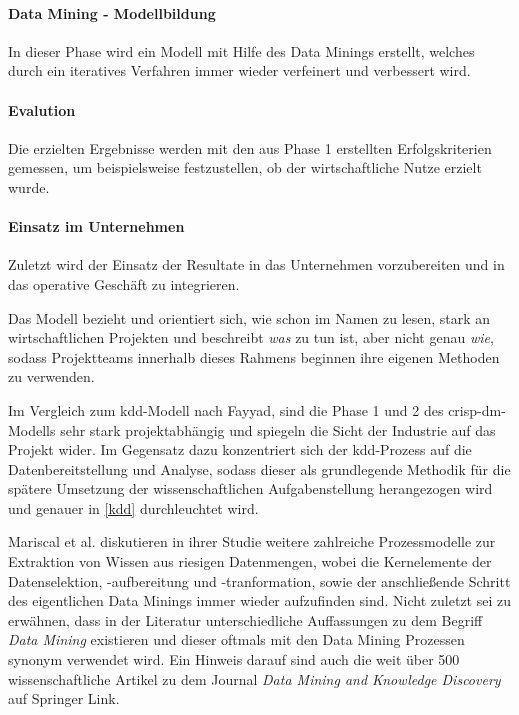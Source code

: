 \paragraph{Data Mining - Modellbildung}
In dieser Phase wird ein Modell mit Hilfe des Data Minings erstellt, welches durch ein iteratives Verfahren immer wieder verfeinert und verbessert wird. 
\paragraph{Evalution}
Die erzielten Ergebnisse werden mit den aus Phase 1 erstellten Erfolgskriterien gemessen, um beispielsweise festzustellen, ob der wirtschaftliche Nutze erzielt wurde.
\paragraph{Einsatz im Unternehmen}
Zuletzt wird der Einsatz der Resultate in das Unternehmen vorzubereiten und in das operative Geschäft zu integrieren.

Das Modell bezieht und orientiert sich, wie schon im Namen zu lesen, stark an wirtschaftlichen Projekten und beschreibt \textit{was} zu tun ist, aber nicht genau \textit{wie}, sodass Projektteams innerhalb dieses Rahmens beginnen ihre eigenen Methoden zu verwenden.

Im Vergleich zum \gls{kdd}-Modell nach Fayyad, sind die Phase 1 und 2 des \gls{crisp-dm}-Modells sehr stark projektabhängig und spiegeln die Sicht der Industrie auf das Projekt wider. Im Gegensatz dazu konzentriert sich der \gls{kdd}-Prozess auf die Datenbereitstellung und Analyse, sodass dieser als grundlegende Methodik für die spätere Umsetzung der wissenschaftlichen Aufgabenstellung herangezogen wird und genauer in \vref{kdd} durchleuchtet wird.

Mariscal et al. diskutieren in ihrer Studie weitere zahlreiche Prozessmodelle zur Extraktion von Wissen aus riesigen Datenmengen, wobei die Kernelemente der Datenselektion, -aufbereitung und -tranformation, sowie der anschließende Schritt des eigentlichen Data Minings immer wieder aufzufinden sind. Nicht zuletzt sei zu erwähnen, dass in der Literatur unterschiedliche Auffassungen zu dem Begriff \textit{Data Mining} existieren und dieser oftmals mit den Data Mining Prozessen synonym verwendet wird. Ein Hinweis darauf sind auch die weit über 500 wissenschaftliche Artikel zu dem Journal \textit{Data Mining and Knowledge Discovery} auf Springer Link.

